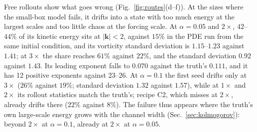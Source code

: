 Free rollouts show what goes wrong (Fig.~\ref{fig:routes}(d--f)). At the
sizes where the small-box model fails, it drifts into a state with too
much energy at the largest scales and too little chaos at the forcing
scale. At $\alpha=0.05$ and $2\times$, $42$--$44\%$ of its kinetic energy sits
at $|\bm k|<2$, against $15\%$ in the PDE run from the same initial
condition, and its vorticity standard deviation is $1.15$--$1.23$ against
$1.41$; at $3\times$ the share reaches $61\%$ against $22\%$, and the standard
deviation $0.92$ against $1.43$. Its leading exponent falls to $0.070$
against the truth's $0.111$, and it has 12 positive exponents against
23--26. At $\alpha=0.1$ the first seed drifts only at $3\times$ ($26\%$ against
$19\%$; standard deviation $1.32$ against $1.57$), while at $1\times$ and $2\times$
its rollout statistics match the truth's; recipe C2, which misses at
$2\times$, already drifts there ($22\%$ against $8\%$). The failure thus appears where
the truth's own large-scale energy grows with the channel width
(Sec.~\ref{sec:kolmogorov}): beyond $2\times$ at $\alpha=0.1$, already at $2\times$
at $\alpha=0.05$.

